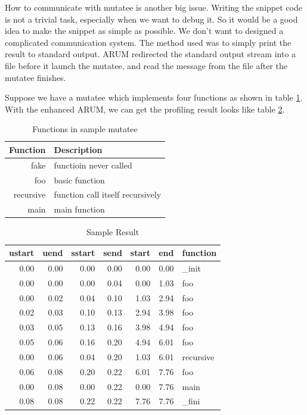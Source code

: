 \documentclass[11pt,letterpaper,oneside]{article}
\begin{document}
How to communicate with mutatee is another big issue. Writing the snippet code is not a trivial task, especially when we want to debug it. So it would be a good idea to make the snippet as simple as possible. We don't want to designed a complicated communication system. The method used was to simply print the result to standard output. ARUM redirected the standard output stream into a file before it launch the mutatee, and read the message from the file after the mutatee finishes.

Suppose we have a mutatee which implements four functions as shown in table \ref{tab:mutatee}. With the enhanced ARUM, we can get the profiling result looks like table \ref{tab:sampleresult}.

\begin{table}[th]
\caption{Functions in sample mutatee}
\centering
\begin{tabular}{rl}
\hline
Function & Description \\
\hline
fake & functioin never called \\
foo  & basic function \\
recursive & function call itself recursively \\
main & main function \\
\hline
\end{tabular}
\label{tab:mutatee}
\end{table}

\begin{table}[th]
\caption{Sample Result}
\centering
\begin{tabular}{rrrrrrl}
\hline
ustart & uend & sstart & send & start & end & function \\
\hline
0.00 & 0.00 & 0.00 & 0.00 & 0.00 & 0.00 & \_init \\
0.00 & 0.00 & 0.00 & 0.04 & 0.00 & 1.03 & foo \\
0.00 & 0.02 & 0.04 & 0.10 & 1.03 & 2.94 & foo \\
0.02 & 0.03 & 0.10 & 0.13 & 2.94 & 3.98 & foo \\
0.03 & 0.05 & 0.13 & 0.16 & 3.98 & 4.94 & foo \\
0.05 & 0.06 & 0.16 & 0.20 & 4.94 & 6.01 & foo \\
0.00 & 0.06 & 0.04 & 0.20 & 1.03 & 6.01 & recursive \\
0.06 & 0.08 & 0.20 & 0.22 & 6.01 & 7.76 & foo \\
0.00 & 0.08 & 0.00 & 0.22 & 0.00 & 7.76 & main \\
0.08 & 0.08 & 0.22 & 0.22 & 7.76 & 7.76 & \_fini \\
\hline
\end{tabular}
\label{tab:sampleresult}
\end{table}
\end{document}
